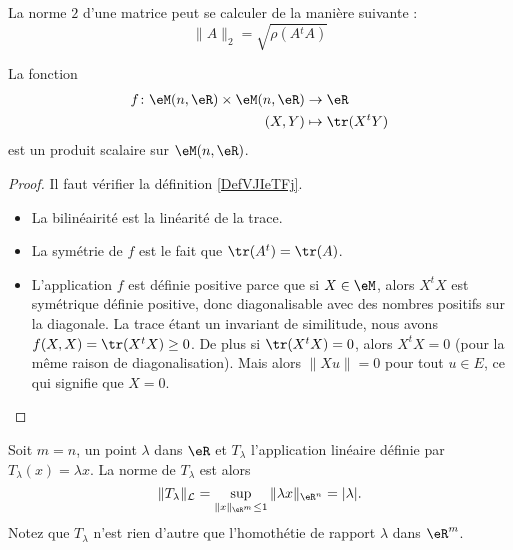 \begin{theorem}
    La norme $2$ d'une matrice peut se calculer de la manière suivante :
    \begin{equation}
        \|A\|_2=\sqrt{\rho(A{^t}A)}
    \end{equation}
\end{theorem}

\begin{proposition} \label{PropMAQoKAg}
    La fonction
    \begin{equation}
        \begin{aligned}
            f\colon \eM(n,\eR)\times \eM(n,\eR)&\to \eR \\
            (X,Y)&\mapsto \tr(X^tY) 
        \end{aligned}
    \end{equation}
    est un produit scalaire sur \( \eM(n,\eR)\).
\end{proposition}

\begin{proof}
    Il faut vérifier la définition \ref{DefVJIeTFj}.
    \begin{itemize}
        \item La bilinéairité est la linéarité de la trace.
        \item La symétrie de \( f\) est le fait que \( \tr(A^t)=\tr(A)\).
        \item L'application \( f\) est définie positive parce que si \( X\in \eM\), alors \( X^tX\) est symétrique définie positive, donc diagonalisable avec des nombres positifs sur la diagonale. La trace étant un invariant de similitude, nous avons \( f(X,X)=\tr(X^tX)\geq 0\). De plus si \( \tr(X^tX)=0\), alors \( X^tX=0\) (pour la même raison de diagonalisation). Mais alors \( \| Xu \|=0\) pour tout \( u\in E\), ce qui signifie que \( X=0\).
    \end{itemize}
\end{proof}

\begin{example}
	Soit $m=n$, un point $\lambda$ dans $\eR$ et $T_{\lambda}$ l'application linéaire définie par $T_{\lambda}(x)=\lambda x$. La norme de $T_{\lambda}$ est alors
\[
\|T_{\lambda}\|_{\mathcal{L}}=\sup_{\|x\|_{\eR^m}\leq 1}\|\lambda x\|_{\eR^n}= |\lambda|.
\]
Notez que $T_{\lambda}$ n'est rien d'autre que l'homothétie de rapport $\lambda$ dans $\eR^m$.
\end{example}


